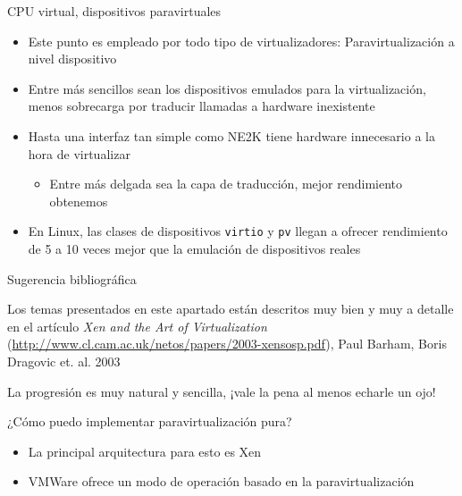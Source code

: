 \documentclass[presentation]{beamer}
\begin{document}
\begin{frame}[label={sec:orga2c7559},fragile]{CPU virtual, dispositivos paravirtuales}
 \begin{itemize}
\item Este punto es empleado por todo tipo de virtualizadores:
Paravirtualización a nivel dispositivo
\item Entre más sencillos sean los dispositivos emulados para la
virtualización, menos sobrecarga por traducir llamadas a hardware
inexistente
\item Hasta una interfaz tan simple como NE2K tiene hardware innecesario
a la hora de virtualizar
\begin{itemize}
\item Entre más delgada sea la capa de traducción, mejor rendimiento
obtenemos
\end{itemize}
\item En Linux, las clases de dispositivos \texttt{virtio} y \texttt{pv} llegan a
ofrecer rendimiento de 5 a 10 veces mejor que la emulación de
dispositivos reales
\end{itemize}
\end{frame}

\begin{frame}[label={sec:org4bcf581}]{Sugerencia bibliográfica}
\begin{center}
Los temas presentados en este apartado están descritos muy bien y muy
a detalle en el artículo \emph{Xen and the Art of Virtualization}
(\url{http://www.cl.cam.ac.uk/netos/papers/2003-xensosp.pdf}), Paul Barham,
Boris Dragovic et. al. 2003

La progresión es muy natural y sencilla, ¡vale la pena al menos echarle
un ojo!
\end{center}
\end{frame}



\begin{frame}[label={sec:orga6c536c}]{¿Cómo puedo implementar paravirtualización pura?}
\begin{itemize}
\item La principal arquitectura para esto es Xen
\item VMWare ofrece un modo de operación basado en la paravirtualización
\end{itemize}
\end{frame}
\end{document}
